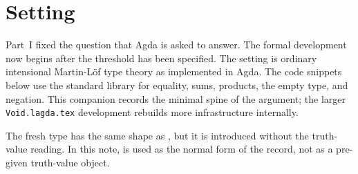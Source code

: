 \documentclass[11pt]{article}
\begin{document}
\section{Setting}

Part~I fixed the question that Agda is asked to answer.  The formal
development now begins after the threshold has been specified.  The
setting is ordinary intensional Martin-L\"of type theory as implemented
in Agda.  The code snippets below use the standard library for equality,
sums, products, the empty type, and negation.  This companion records the
minimal spine of the argument; the larger \texttt{Void.lagda.tex}
development rebuilds more infrastructure internally.

The fresh type  has the same shape as
, but it is introduced without the truth-value
reading.  In this note,  is used as the normal form of
the  record, not as a pre-given truth-value
object.
\end{document}
